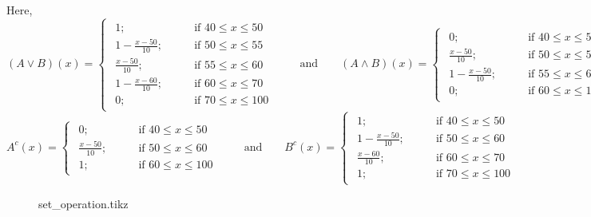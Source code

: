 \documentclass[../main-sheet.tex]{subfiles}
\begin{document}
\begin{soln}
    Here,
    \[
            (A\vee B)(x)=\begin{cases}
            \begin{aligned}
                1; \qquad&\text{if } 40\leq x\leq 50\\
                1-\frac{x-50}{10}; \qquad&\text{if } 50\leq x\leq 55\\
                \frac{x-50}{10}; \qquad&\text{if } 55\leq x\leq 60\\
                1-\frac{x-60}{10}; \qquad&\text{if } 60\leq x\leq 70\\
                0; \qquad&\text{if } 70\leq x\leq 100
            \end{aligned}
    \end{cases}
    \qquad\text{and}\qquad
    (A\wedge B)(x)=\begin{cases}
        \begin{aligned}
            0; \qquad&\text{if } 40\leq x\leq 50\\
            \frac{x-50}{10} ; \qquad&\text{if }50 \leq x\leq 55\\
            1-\frac{x-50}{10} ; \qquad&\text{if }55 \leq x\leq 60\\
            0; \qquad&\text{if }60\leq x\leq 100
        \end{aligned}
    \end{cases}
    \]
    \[
            A^c(x)=\begin{cases}
            \begin{aligned}
                0; \qquad&\text{if } 40\leq x\leq 50\\
                \frac{x-50}{10}; \qquad&\text{if } 50\leq x\leq 60\\
                1; \qquad&\text{if }60\leq x\leq100
            \end{aligned}
    \end{cases}
    \qquad\text{and}\qquad
    B^c(x)=\begin{cases}
        \begin{aligned}
            1; \qquad&\text{if }40\leq x\leq 50\\
            1-\frac{x-50}{10} ; \qquad&\text{if }50 \leq x\leq 60\\
            \frac{x-60}{10}; \qquad&\text{if }60\leq x\leq 70\\
            1; \qquad&\text{if }70\leq x\leq 100
        \end{aligned}
    \end{cases}
    \]
    \begin{figure}[H]
        \centering
        {set_operation.tikz}
    \end{figure}
\end{soln}
\end{document}
